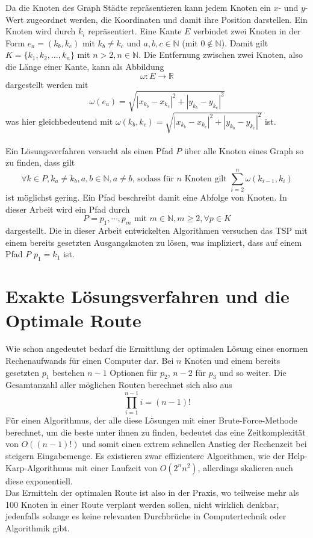 Da die Knoten des Graph Städte repräsentieren kann jedem Knoten ein $x$- und $y$- Wert zugeordnet werden, die Koordinaten und damit ihre Position darstellen.
Ein Knoten wird durch $k_i$ repräsentiert.
Eine Kante $E$ verbindet zwei Knoten in der Form $e_a = (k_b,k_c)$ mit $k_b \neq k_c$ und $a,b,c \in \mathbb{N}$ (mit $0 \not \in \mathbb{N}$).
Damit gilt $K=\{k_1,k_2,...,k_n\}$ mit $n > 2, n \in \mathbb{N}$.
Die Entfernung zwischen zwei Knoten, also die Länge einer Kante, kann als Abbildung $$\omega : E \rightarrow \mathbb{R}$$ 
dargestellt werden mit 
$$\omega(e_a) = \sqrt{|x_{k_b} - x_{k_c}|^2 + |y_{k_b} - y_{k_c}|^2}$$
was hier gleichbedeutend mit $\omega(k_b,k_c) = \sqrt{|x_{k_b} - x_{k_c}|^2 + |y_{k_b} - y_{k_c}|^2}$ ist.
\\\\
Ein Lösungsverfahren versucht als einen Pfad $P$ über alle Knoten eines Graph so zu finden, dass gilt
$$\forall k \in P,k_a \neq k_b, a,b\in \mathbb{N},a\neq b \textrm{, sodass für $n$ Knoten gilt } \sum_{i=2}^n \omega(k_{i-1},k_i)$$
ist möglichst gering.
Ein Pfad beschreibt damit eine Abfolge von Knoten. In dieser Arbeit wird ein Pfad durch
$$P=p_1,\cdots,p_m \textrm{ mit } m\in\mathbb{N},m \geq 2, \forall p \in K$$
dargestellt.
Die in dieser Arbeit entwickelten Algorithmen versuchen das \ac{TSP} mit einem bereits gesetzten Ausgangsknoten zu lösen, was impliziert, dass auf einem Pfad $P$ $p_1 = k_1$ ist.
\section{Exakte Lösungsverfahren und die Optimale Route}
Wie schon angedeutet bedarf die Ermittlung der optimalen Lösung eines enormen Rechenaufwands für einen Computer dar.
Bei $n$ Knoten und einem bereits gesetzten $p_1$ bestehen $n-1$ Optionen für $p_2$, $n-2$ für $p_3$ und so weiter.
Die Gesamtanzahl aller möglichen Routen berechnet sich also aus
$$\prod_{i=1}^{n-1} i = (n-1)!$$
Für einen Algorithmus, der alle diese Lösungen mit einer Brute-Force-Methode berechnet, um die beste unter ihnen zu finden, bedeutet das eine Zeitkomplexität von $O((n-1)!)$ und somit einen extrem schnellen Anstieg der Rechenzeit bei steigern Eingabemenge.\autocite[18]{Gurski.2010}
Es existieren zwar effizientere Algorithmen, wie der Help-Karp-Algorithmus\autocite[14]{Hutchinson.2016} mit einer Laufzeit von $O(2^nn^2)$, allerdings skalieren auch diese exponentiell.
\\
Das Ermitteln der optimalen Route ist also in der Praxis, wo teilweise mehr als 100 Knoten in einer Route verplant werden sollen, nicht wirklich denkbar, jedenfalls solange es keine relevanten Durchbrüche in Computertechnik oder Algorithmik gibt.

